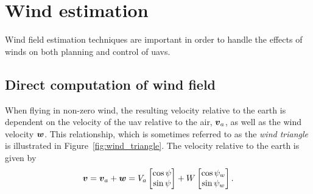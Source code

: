 \section{Wind estimation}
Wind field estimation techniques are important in order to handle the effects of winds on both planning and control of \acp{uav}.

\subsection{Direct computation of wind field}
When flying in non-zero wind, the resulting velocity relative to the earth is dependent on the velocity 
of the \ac{uav} relative to the air, $\boldsymbol{v}_a$, as well as the wind velocity $\boldsymbol{w}$.
This relationship, which is sometimes referred to as the \textit{wind triangle} is illustrated in Figure~\ref{fig:wind_triangle}. The 
velocity relative to the earth is given by 
\begin{equation}\label{eq:inertial_vel}
    \boldsymbol{v} =\boldsymbol{v}_a + \boldsymbol{w} = V_a\begin{bmatrix}
        \cos\psi \\
        \sin\psi
    \end{bmatrix}
    + W\begin{bmatrix}
        \cos\psi_w\\
        \sin\psi_w
    \end{bmatrix}
    .
\end{equation}

